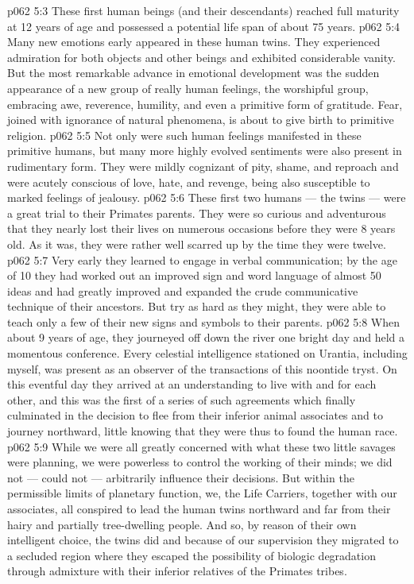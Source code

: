 \vs p062 5:3 These first human beings (and their descendants) reached full maturity at 12 years of age and possessed a potential life span of about 75 years.
\vs p062 5:4 Many new emotions early appeared in these human twins. They experienced admiration for both objects and other beings and exhibited considerable vanity. But the most remarkable advance in emotional development was the sudden appearance of a new group of really human feelings, the worshipful group, embracing awe, reverence, humility, and even a primitive form of gratitude. Fear, joined with ignorance of natural phenomena, is about to give birth to primitive religion.
\vs p062 5:5 Not only were such human feelings manifested in these primitive humans, but many more highly evolved sentiments were also present in rudimentary form. They were mildly cognizant of pity, shame, and reproach and were acutely conscious of love, hate, and revenge, being also susceptible to marked feelings of jealousy.
\vs p062 5:6 These first two humans --- the twins --- were a great trial to their Primates parents. They were so curious and adventurous that they nearly lost their lives on numerous occasions before they were 8 years old. As it was, they were rather well scarred up by the time they were twelve.
\vs p062 5:7 Very early they learned to engage in verbal communication; by the age of 10 they had worked out an improved sign and word language of almost 50 ideas and had greatly improved and expanded the crude communicative technique of their ancestors. But try as hard as they might, they were able to teach only a few of their new signs and symbols to their parents.
\vs p062 5:8 When about 9 years of age, they journeyed off down the river one bright day and held a momentous conference. Every celestial intelligence stationed on Urantia, including myself, was present as an observer of the transactions of this noontide tryst. On this eventful day they arrived at an understanding to live with and for each other, and this was the first of a series of such agreements which finally culminated in the decision to flee from their inferior animal associates and to journey northward, little knowing that they were thus to found the human race.
\vs p062 5:9 While we were all greatly concerned with what these two little savages were planning, we were powerless to control the working of their minds; we did not --- could not --- arbitrarily influence their decisions. But within the permissible limits of planetary function, we, the Life Carriers, together with our associates, all conspired to lead the human twins northward and far from their hairy and partially tree\hyp{}dwelling people. And so, by reason of their own intelligent choice, the twins did  and because of our supervision they migrated  to a secluded region where they escaped the possibility of biologic degradation through admixture with their inferior relatives of the Primates tribes.
